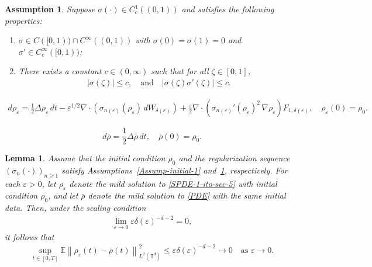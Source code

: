 \documentclass[10pt,a4paper]{amsart}
\newtheorem{assumption}{Assumption}
\newtheorem{lemma}{Lemma}
\def\geq{\geqslant}
\def\leq{\leqslant}
\begin{document}
\begin{assumption}\label{Assump-sigman}
Suppose $\sigma(\cdot) \in C^{1}_{c}((0,1))$ and satisfies the following properties:
\begin{enumerate}
    \item[(1)] $\sigma \in C([0,1)) \cap C^{\infty}((0,1))$ with $\sigma(0)=\sigma(1)=0$ and $\sigma' \in C^{\infty}_c([0,1))$;
    \item[(2)] There exists a constant $c \in (0,\infty)$ such that for all $\zeta \in [0,1]$,
    \begin{align}
        |\sigma(\zeta)| \leq c, \quad \text{and} \quad |\sigma(\zeta)\sigma'(\zeta)| \leq c.
    \end{align}
\end{enumerate}
\end{assumption}

\begin{align}\label{SPDE-1-ito-sec-5}
d\rho_{\varepsilon} = \frac{1}{2}\Delta \rho_{\varepsilon}\,dt - \varepsilon^{1/2} \nabla\cdot\left(\sigma_{n(\varepsilon)}(\rho_{\varepsilon})\, dW_{\delta(\varepsilon)}\right) + \frac{\varepsilon}{2} \nabla\cdot\left(\sigma_{n(\varepsilon)}'(\rho_{\varepsilon})^2\, \nabla \rho_{\varepsilon} \right) F_{1,\delta(\varepsilon)},\quad \rho_{\varepsilon}(0)=\rho_0. 
\end{align}

\begin{equation}\label{PDE}
d\bar{\rho} = \frac{1}{2}\Delta\bar{\rho}\, dt, \quad \bar{\rho}(0) = \rho_0.
\end{equation}

\begin{lemma}\label{lem-LLN-regular}
Assume that the initial condition $\rho_0$ and the regularization sequence $(\sigma_n(\cdot))_{n \geq 1}$ satisfy Assumptions~\ref{Assump-initial-1} and~\ref{Assump-sigman}, respectively. For each $\varepsilon > 0$, let $\rho_{\varepsilon}$ denote the mild solution to \eqref{SPDE-1-ito-sec-5} with initial condition $\rho_0$, and let $\bar{\rho}$ denote the mild solution to \eqref{PDE} with the same initial data. Then, under the scaling condition
\begin{align*}
\lim_{\varepsilon \to 0} \varepsilon \delta(\varepsilon)^{-d-2} = 0,
\end{align*}
it follows that
\begin{align*}
\sup_{t\in[0,T]}\mathbb{E} \left\| \rho_{\varepsilon}(t) - \bar{\rho}(t) \right\|_{L^2(\mathbb{T}^d)}^2 
\leq \varepsilon \delta(\varepsilon)^{-d-2} 
\longrightarrow 0 \quad \text{as } \varepsilon \to 0.
\end{align*}
\end{lemma}
\end{document}
